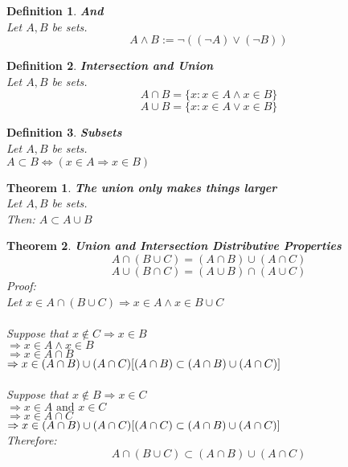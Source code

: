 \documentclass[12pt]{extarticle}
\theoremstyle{plain}
\newtheorem{thm}{Theorem}[section]
\theoremstyle{plain}
\theoremstyle{Definition}
\newtheorem{def.}{Definition}[section]
\theoremstyle{Definition}
\theoremstyle{plain}
\begin{document}
\begin{def.} \textbf{And} \\
	Let $A,B$ be sets. \\ 
	$$A \land B := \lnot((\lnot A) \lor (\lnot B))$$ 
\end{def.}
\begin{def.} \textbf{Intersection and Union} \\
	Let $A,B$ be sets. \\ 
	$$A \cap B = \{ x : x \in A \land x \in B\}$$
	$$A \cup B = \{ x : x \in A \lor x \in B\}$$
\end{def.}

\begin{def.} \textbf{Subsets} \\ 
	Let $A,B$ be sets. \\ 
	$A \subset B \Leftrightarrow (x \in A \Rightarrow x \in B)$
\end{def.}
\begin{thm} \textbf{The union only makes things larger} \\
	Let $A,B$ be sets. \\ 
	Then: $A \subset A \cup B$ \\ 
\end{thm}
\begin{thm} \textbf{Union and Intersection Distributive Properties} \\ 
	$$A \cap (B \cup C) = (A \cap B) \cup (A \cap C)$$ 	
	$$A \cup (B \cap C) = (A \cup B) \cap (A \cup C)$$
	Proof: \\
	Let $x \in A \cap (B \cup C) \Rightarrow x \in A \land x \in B \cup C$ \\ \\
	Suppose that $x \not \in C \Rightarrow x \in B$ \\ 
	$\Rightarrow x \in A \land x \in B$ \\ 
	$\Rightarrow x \in A \cap B$ \\ 
	$\Rightarrow x \in (A \cap B) \cup (A \cap C) \hfill [(A \cap B) \subset (A \cap B) \cup (A \cap C)]$ \\ \\
	Suppose that $x \not \in B \Rightarrow x \in C$ \\ 
	$\Rightarrow x \in A \text{ and } x \in C$ \\ 
	$\Rightarrow x \in A \cap C$ \\ 
	$\Rightarrow x \in (A \cap B) \cup (A \cap C) \hfill [(A \cap C) \subset (A \cap B) \cup (A \cap C)]$ \\
	Therefore: \\ 
	$$A \cap (B \cup C) \subset (A \cap B) \cup (A \cap C)$$ 	
\end{thm}
\end{document}

